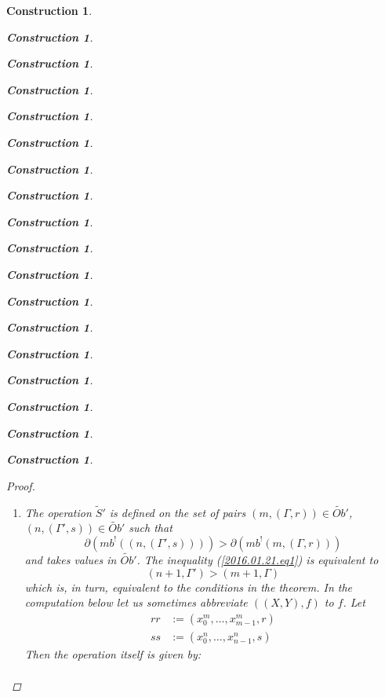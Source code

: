 \documentclass[onecolumn,12pt]{amsart}
\numberwithin{proposition}{subsection}
\newtheorem{construction}[proposition]{Construction}
\newcommand{\wt}{\widetilde}
\newcommand{\wh}{\widehat}
\newcommand{\spc}{{\,\,\,\,\,\,\,}}
\begin{document}
\begin{construction}
\begin{construction}
\begin{construction}
\begin{construction}
\begin{construction}
\begin{construction}
\begin{construction}
\begin{construction}
\begin{construction}
\begin{construction}
\begin{construction}
\begin{construction}
\begin{construction}
\begin{construction}
\begin{construction}
\begin{construction}
\begin{construction}
\begin{construction}
\begin{proof}
\begin{enumerate}
where $A=(m+1,\Gamma)$, $B=(n,\Gamma')$ and $i=n-m-1$. To apply Lemma
\ref{2016.01.31.l1} we should take $X=\wh{m}$, $lx=m$ and $Y=\wh{n}$, $ly=n$,
and $$f=((ft(A),A),(x^{m}_0,\dots,x^{m}_{m-1},r)).$$  Let further
$rr=(x^{m}_0,\dots,x^{m}_{m-1},r)$. Then we can extend these equalities as
follows.
%
\begin{equation*}
  \begin{split}
    f^*&((n,\Gamma'),i)
    \\&=
    (rr^*(\wh{n},i),(T_0,\dots,T_{m-1},
    \\& \spc\spc\spc\spc
    q(rr,ft^i(\wh{n}),0)(T'_{m+1}),\dots,q(rr,ft(\wh{n}),i-1)(T'_{n-1})))
    \\&=
    (n-1,(T_0,\dots,T_{m-1},
    \\& \spc\spc\spc\spc
    rr(T'_{m+1}),\dots,qq^{n-m-2}(rr)(T'_{n-1})))
    \\&=
    (n-1,(T_0',\dots,T_{m-1}',
    \\& \spc\spc\spc\spc
    rr(T_{m+1}'),qq(rr)(T_{m+2}'),\dots,qq^{n-m-2}(rr)(T_{n-1}'))),
  \end{split}
\end{equation*}
%
where the last equality holds by the assumption that $T_i=T_i'$ for $i=0,\dots,m$. 
The required formula follows from the equality 
%
$$qq^j(rr)(T_{m+j+1}')=\theta_{m,m+j+1}(r,T_{m+j+1}').$$
%
\item The operation $\wt{S}'$ is defined on the set of pairs $(m,(\Gamma,r))\in \wt{Ob}'$, $(n,(\Gamma',s))\in \wt{Ob}'$ such that 
%
\begin{equation}\label{2016.01.21.eq1}
\partial(mb^!((n,(\Gamma',s))))>\partial(mb^!(m,(\Gamma,r)))
\end{equation}%
%
and takes values in $\wt{Ob}'$. The inequality (\ref{2016.01.21.eq1}) is equivalent to 
%
$$(n+1,\Gamma')>(m+1,\Gamma)$$
%
which is, in turn, equivalent to the conditions in the theorem. In the computation  below let us sometimes abbreviate $((X,Y),f)$ to $f$. Let
%
\begin{equation*}
  \begin{split}
    rr&:=(x_0^m,\dots,x_{m-1}^m,r)\\
    ss&:=(x_0^n,\dots,x_{n-1}^n,s)
  \end{split}
\end{equation*}
%
Then the operation itself is given by:
\begin{equation*}
  \begin{split}

\end{split}
\end{equation*}
\end{enumerate}
\end{proof}
\end{construction}
\end{construction}
\end{construction}
\end{construction}
\end{construction}
\end{construction}
\end{construction}
\end{construction}
\end{construction}
\end{construction}
\end{construction}
\end{construction}
\end{construction}
\end{construction}
\end{construction}
\end{construction}
\end{construction}
\end{construction}
\end{document}
